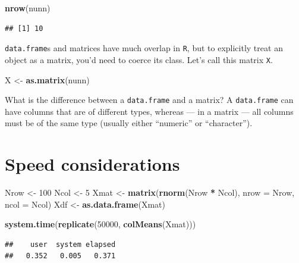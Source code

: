 \documentclass[]{book}
\newenvironment{Shaded}{\begin{snugshade}}{\end{snugshade}}
\newcommand{\KeywordTok}[1]{\textcolor[rgb]{0.13,0.29,0.53}{\textbf{#1}}}
\newcommand{\DataTypeTok}[1]{\textcolor[rgb]{0.13,0.29,0.53}{#1}}
\newcommand{\DecValTok}[1]{\textcolor[rgb]{0.00,0.00,0.81}{#1}}
\newcommand{\StringTok}[1]{\textcolor[rgb]{0.31,0.60,0.02}{#1}}
\newcommand{\OperatorTok}[1]{\textcolor[rgb]{0.81,0.36,0.00}{\textbf{#1}}}
\newcommand{\NormalTok}[1]{#1}
\theoremstyle{definition}
\theoremstyle{definition}
\theoremstyle{definition}
\theoremstyle{remark}
\begin{document}
\begin{Shaded}
\begin{Highlighting}[]
\KeywordTok{nrow}\NormalTok{(nunn)}
\end{Highlighting}
\end{Shaded}

\begin{verbatim}
## [1] 10
\end{verbatim}

\texttt{data.frame}s and matrices have much overlap in \texttt{R}, but
to explicitly treat an object as a matrix, you'd need to coerce its
class. Let's call this matrix \texttt{X}.

\begin{Shaded}
\begin{Highlighting}[]
\NormalTok{X <-}\StringTok{ }\KeywordTok{as.matrix}\NormalTok{(nunn)}
\end{Highlighting}
\end{Shaded}

What is the difference between a \texttt{data.frame} and a matrix? A
\texttt{data.frame} can have columns that are of different types,
whereas --- in a matrix --- all columns must be of the same type
(usually either ``numeric'' or ``character'').

\section{Speed considerations}\label{speed-considerations}

\begin{Shaded}
\begin{Highlighting}[]
\NormalTok{Nrow <-}\StringTok{ }\DecValTok{100}
\NormalTok{Ncol  <-}\StringTok{ }\DecValTok{5}
\NormalTok{Xmat <-}\StringTok{ }\KeywordTok{matrix}\NormalTok{(}\KeywordTok{rnorm}\NormalTok{(Nrow }\OperatorTok{*}\StringTok{ }\NormalTok{Ncol), }\DataTypeTok{nrow =}\NormalTok{ Nrow, }\DataTypeTok{ncol =}\NormalTok{ Ncol)}
\NormalTok{Xdf <-}\StringTok{ }\KeywordTok{as.data.frame}\NormalTok{(Xmat)}

\KeywordTok{system.time}\NormalTok{(}\KeywordTok{replicate}\NormalTok{(}\DecValTok{50000}\NormalTok{, }\KeywordTok{colMeans}\NormalTok{(Xmat)))}
\end{Highlighting}
\end{Shaded}

\begin{verbatim}
##    user  system elapsed 
##   0.352   0.005   0.371
\end{verbatim}
\end{document}
